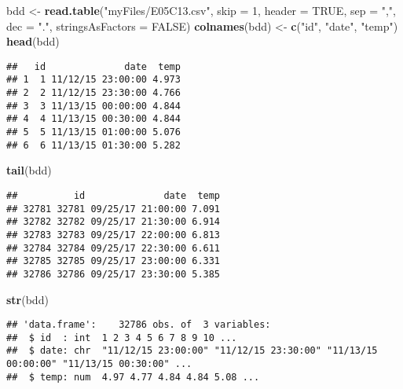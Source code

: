\documentclass[]{book}
\newenvironment{Shaded}{\begin{snugshade}}{\end{snugshade}}
\newcommand{\KeywordTok}[1]{\textcolor[rgb]{0.13,0.29,0.53}{\textbf{#1}}}
\newcommand{\DataTypeTok}[1]{\textcolor[rgb]{0.13,0.29,0.53}{#1}}
\newcommand{\DecValTok}[1]{\textcolor[rgb]{0.00,0.00,0.81}{#1}}
\newcommand{\StringTok}[1]{\textcolor[rgb]{0.31,0.60,0.02}{#1}}
\newcommand{\OtherTok}[1]{\textcolor[rgb]{0.56,0.35,0.01}{#1}}
\newcommand{\NormalTok}[1]{#1}
\theoremstyle{definition}
\theoremstyle{definition}
\theoremstyle{definition}
\theoremstyle{remark}
\begin{document}
\begin{Shaded}
\begin{Highlighting}[]
\NormalTok{bdd <-}\StringTok{ }\KeywordTok{read.table}\NormalTok{(}\StringTok{"myFiles/E05C13.csv"}\NormalTok{, }\DataTypeTok{skip =} \DecValTok{1}\NormalTok{, }\DataTypeTok{header =} \OtherTok{TRUE}\NormalTok{, }
  \DataTypeTok{sep =} \StringTok{","}\NormalTok{, }\DataTypeTok{dec =} \StringTok{"."}\NormalTok{, }\DataTypeTok{stringsAsFactors =} \OtherTok{FALSE}\NormalTok{)}
\KeywordTok{colnames}\NormalTok{(bdd) <-}\StringTok{ }\KeywordTok{c}\NormalTok{(}\StringTok{"id"}\NormalTok{, }\StringTok{"date"}\NormalTok{, }\StringTok{"temp"}\NormalTok{)}
\KeywordTok{head}\NormalTok{(bdd)}
\end{Highlighting}
\end{Shaded}

\begin{verbatim}
##   id              date  temp
## 1  1 11/12/15 23:00:00 4.973
## 2  2 11/12/15 23:30:00 4.766
## 3  3 11/13/15 00:00:00 4.844
## 4  4 11/13/15 00:30:00 4.844
## 5  5 11/13/15 01:00:00 5.076
## 6  6 11/13/15 01:30:00 5.282
\end{verbatim}

\begin{Shaded}
\begin{Highlighting}[]
\KeywordTok{tail}\NormalTok{(bdd)}
\end{Highlighting}
\end{Shaded}

\begin{verbatim}
##          id              date  temp
## 32781 32781 09/25/17 21:00:00 7.091
## 32782 32782 09/25/17 21:30:00 6.914
## 32783 32783 09/25/17 22:00:00 6.813
## 32784 32784 09/25/17 22:30:00 6.611
## 32785 32785 09/25/17 23:00:00 6.331
## 32786 32786 09/25/17 23:30:00 5.385
\end{verbatim}

\begin{Shaded}
\begin{Highlighting}[]
\KeywordTok{str}\NormalTok{(bdd)}
\end{Highlighting}
\end{Shaded}

\begin{verbatim}
## 'data.frame':    32786 obs. of  3 variables:
##  $ id  : int  1 2 3 4 5 6 7 8 9 10 ...
##  $ date: chr  "11/12/15 23:00:00" "11/12/15 23:30:00" "11/13/15 00:00:00" "11/13/15 00:30:00" ...
##  $ temp: num  4.97 4.77 4.84 4.84 5.08 ...
\end{verbatim}
\end{document}
